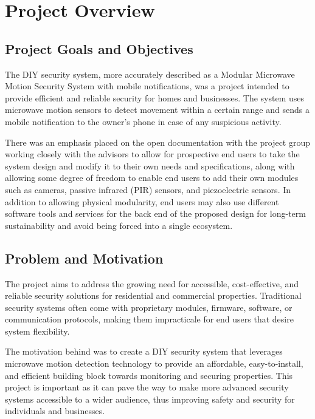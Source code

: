 \section{Project Overview}\label{sec:project-overview}

\subsection{Project Goals and Objectives}\label{subsec:project-goals-and-objectives}
The \brand{} DIY security system, more accurately described as a Modular Microwave Motion
Security System with mobile notifications, was a project intended to provide efficient
and reliable security for homes and businesses. The system uses microwave motion
sensors to detect movement within a certain range and sends a mobile notification to
the owner's phone in case of any suspicious activity.

There was an emphasis placed on the open documentation with the project group working
closely with the advisors to allow for prospective end users to take the system design
and modify it to their own needs and specifications, along with allowing some degree of
freedom to enable end users to add their own modules such as cameras, passive infrared
(PIR) sensors, and piezoelectric sensors. In addition to allowing physical modularity, end users
may also use different software tools and services for the back end of the proposed design for
long-term sustainability and avoid being forced into a single ecosystem.

\subsection{Problem and Motivation}\label{subsec:problem-and-motivation}

The \brand{} project aims to address the growing need for accessible, cost-effective,
and reliable security solutions for residential and commercial properties.
Traditional security systems often come with proprietary modules, firmware, software,
or communication protocols, making them impracticale for end users that desire system flexibility.

The motivation behind \brand{} was to create a DIY security system that leverages
microwave motion detection technology to provide an affordable, easy-to-install, and
efficient building block towards monitoring and securing properties. This project is important as
it can pave the way to make more advanced security systems accessible to a wider
audience, thus improving safety and security for individuals and businesses.

